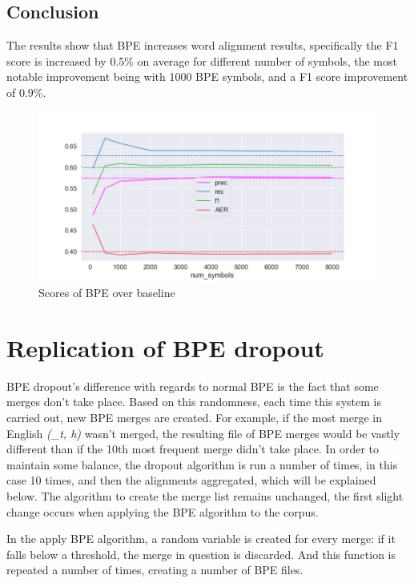 \subsection{Conclusion}

The results show that BPE increases word alignment results, specifically the F1 score is increased by 0.5\% on average for different number of symbols, the most notable improvement being with 1000 BPE symbols, and a F1 score improvement of 0.9\%.

\begin{figure}[!ht]
    \centering
    \includegraphics[width=14cm]{figures/eng_deu_fastalign.png}
    \caption{Scores of BPE over baseline}
\end{figure}

\section{Replication of BPE dropout}\label{sec:replbpedrop}

BPE dropout's difference with regards to normal BPE is the fact that some merges don't take place. Based on this randomness, each time this system is carried out, new BPE merges are created. For example, if the most merge in English \emph{(\_t, h)} wasn't merged, the resulting file of BPE merges would be vastly different than if the 10th most frequent merge didn't take place. In order to maintain some balance, the dropout algorithm is run a number of times, in this case 10 times, and then the alignments aggregated, which will be explained below. The algorithm to create the merge list remains unchanged, the first slight change occurs when applying the BPE algorithm to the corpus.

In the apply BPE algorithm, a random variable is created for every merge: if it falls below a threshold, the merge in question is discarded. And this function is repeated a number of times, creating a number of BPE files.

